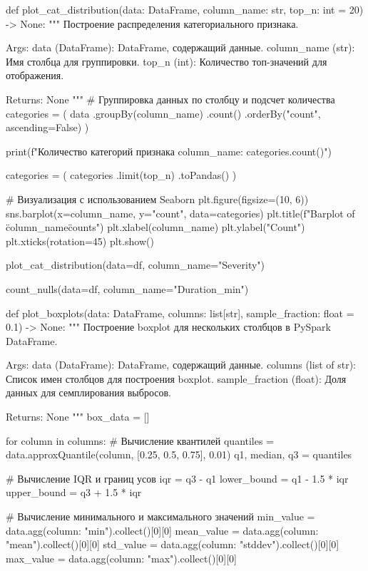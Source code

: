 \begin{code}
def plot_cat_distribution(data: DataFrame,
                          column_name: str,
                          top_n: int = 20) -> None:
    """
    Построение распределения категориального признака.

    Args:
        data (DataFrame): DataFrame, содержащий данные.
        column_name (str): Имя столбца для группировки.
        top_n (int): Количество топ-значений для отображения.
    
    Returns:
        None
    """
    # Группировка данных по столбцу и подсчет количества
    categories = (
        data
        .groupBy(column_name)
        .count()
        .orderBy("count", ascending=False)
    )
    
    print(f"Количество категорий признака {column_name}: {categories.count()}")

    categories = (
        categories
        .limit(top_n)
        .toPandas()
    )
    
    # Визуализация с использованием Seaborn
    plt.figure(figsize=(10, 6))
    sns.barplot(x=column_name, y="count", data=categories)
    plt.title(f"Barplot of \"{column_name}\" counts")
    plt.xlabel(column_name)
    plt.ylabel("Count")
    plt.xticks(rotation=45)
    plt.show()

plot_cat_distribution(data=df, column_name="Severity")

count_nulls(data=df, column_name="Duration_min")

def plot_boxplots(data: DataFrame,
                  columns: list[str],
                  sample_fraction: float = 0.1) -> None:
    """
    Построение boxplot для нескольких столбцов в PySpark DataFrame.

    Args:
        data (DataFrame): DataFrame, содержащий данные.
        columns (list of str): Список имен столбцов для построения boxplot.
        sample_fraction (float): Доля данных для семплирования выбросов.
    
    Returns:
        None
    """
    box_data = []

    for column in columns:
        # Вычисление квантилей
        quantiles = data.approxQuantile(column, [0.25, 0.5, 0.75], 0.01)
        q1, median, q3 = quantiles

        # Вычисление IQR и границ усов
        iqr = q3 - q1
        lower_bound = q1 - 1.5 * iqr
        upper_bound = q3 + 1.5 * iqr

        # Вычисление минимального и максимального значений
        min_value = data.agg({column: "min"}).collect()[0][0]
        mean_value = data.agg({column: "mean"}).collect()[0][0]
        std_value = data.agg({column: "stddev"}).collect()[0][0]
        max_value = data.agg({column: "max"}).collect()[0][0]


\end{code}
